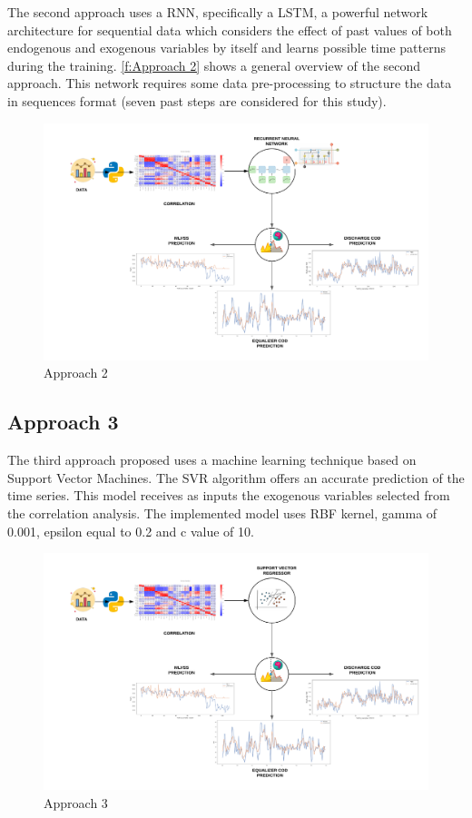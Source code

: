 The second approach uses a \ac{RNN}, specifically a \ac{LSTM}, a powerful network architecture for sequential data which considers the effect of past values of both endogenous and exogenous variables by itself and learns possible time patterns during the training. \autoref{f:Approach 2} shows a general overview of the second approach. This network requires some data pre-processing to structure the data in sequences format (seven past steps are considered for this study).

\begin{figure}[h]
\centering
\includegraphics[width=\linewidth]{figures/Ch4/Approach2.pdf}
\caption{Approach 2}
\label{f:Approach 2}
\end{figure}

\subsection{Approach 3}
\label{s:Approach3}

The third approach proposed uses a machine learning technique based on Support Vector Machines. The \ac{SVR} algorithm offers an accurate prediction of the time series. This model receives as inputs the exogenous variables selected from the correlation analysis. The implemented model uses \ac{RBF} kernel, gamma of 0.001, epsilon equal to 0.2 and c value of 10.

\begin{figure}[h]
\centering
\includegraphics[width=\linewidth]{figures/Ch4/Approach3.pdf}
\caption{Approach 3}
\label{f:Approach 3}
\end{figure}

